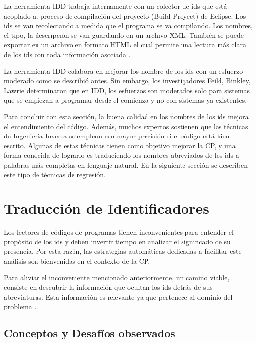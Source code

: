 La herramienta IDD trabaja internamente con un colector de ids que está acoplado al proceso de compilación del proyecto (Build Proyect) de Eclipse. Los ids se van recolectando a medida que el programa se va compilando. Los nombres, el tipo, la descripción se van guardando en un archivo XML. También se puede exportar en un archivo en formato HTML el cual permite una lectura más clara de los ids con toda información asociada \cite{DFPM05}.



La herramienta IDD colabora en mejorar los nombre de los ids con un esfuerzo moderado como se describió antes.
Sin embargo, los investigadores Feild, Binkley, Lawrie \cite{LFBEX07,DLHD06} determinaron que en IDD, los esfuerzos son moderados solo para sistemas que se empiezan a programar desde el comienzo y no con sistemas ya existentes.

Para concluir con esta sección, la buena calidad en los nombres de los ids mejora el entendimiento del código. Además, muchos expertos sostienen que las técnicas de Ingeniería Inversa se emplean con mayor precisión si el código está bien escrito. Algunas de estas técnicas tienen como objetivo mejorar la CP, y una forma conocida de lograrlo es traduciendo los nombres abreviados de los ids a palabras más completas en lenguaje natural. En la siguiente sección se describen este tipo de técnicas de regresión.

\pagebreak
\section{Traducción de Identificadores}
\label{sec:tradIdDicc}%

Los lectores de códigos de programas tienen inconvenientes para entender el propósito de los ids y deben invertir tiempo en analizar el significado de su presencia. Por esta razón, las estrategias automáticas dedicadas a facilitar este análisis son bienvenidas en el contexto de la CP.

Para aliviar el inconveniente mencionado anteriormente, un camino viable, consiste en descubrir la información que ocultan los ids detrás de sus abreviaturas. Esta información es relevante ya que pertenece al dominio del problema \cite{EHPV09,LFBEX07}. 

\subsection{Conceptos y Desafíos observados}

